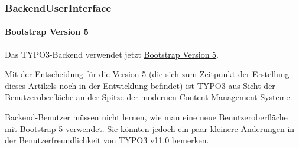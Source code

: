 %

\begin{frame}[fragile]
	\frametitle{BackendUserInterface}
	\framesubtitle{Bootstrap Version 5}

	Das TYPO3-Backend verwendet jetzt
	\href{https://getbootstrap.com/}{Bootstrap Version 5}.

	\vspace{0.2cm}

	Mit der Entscheidung für die Version 5 (die sich zum Zeitpunkt der Erstellung dieses
	Artikels noch in der Entwicklung befindet) ist TYPO3 aus Sicht der Benutzeroberfläche an
	der Spitze der modernen Content Management Systeme.

	\vspace{0.2cm}

	Backend-Benutzer müssen nicht lernen, wie man eine neue Benutzeroberfläche mit
	Bootstrap 5 verwendet. Sie könnten jedoch ein paar kleinere Änderungen in der Benutzerfreundlichkeit
	von TYPO3 v11.0 bemerken.

\end{frame}

